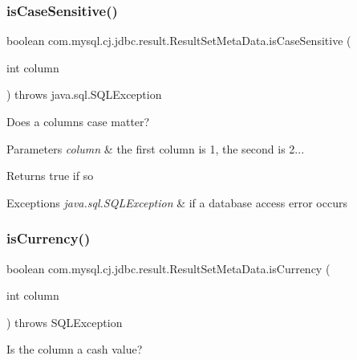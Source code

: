 \subsubsection{\texorpdfstring{is\+Case\+Sensitive()}{isCaseSensitive()}}
{\footnotesize\ttfamily boolean com.\+mysql.\+cj.\+jdbc.\+result.\+Result\+Set\+Meta\+Data.\+is\+Case\+Sensitive (\begin{DoxyParamCaption}\item[{int}]{column }\end{DoxyParamCaption}) throws java.\+sql.\+S\+Q\+L\+Exception}

Does a column\textquotesingle{}s case matter?


\begin{DoxyParams}{Parameters}
{\em column} & the first column is 1, the second is 2...\\
\hline
\end{DoxyParams}
\begin{DoxyReturn}{Returns}
true if so
\end{DoxyReturn}

\begin{DoxyExceptions}{Exceptions}
{\em java.\+sql.\+S\+Q\+L\+Exception} & if a database access error occurs \\
\hline
\end{DoxyExceptions}
\mbox{\label{classcom_1_1mysql_1_1cj_1_1jdbc_1_1result_1_1_result_set_meta_data_ac7a3732650739d19c5fa38abc5c3c174}} 
\subsubsection{\texorpdfstring{is\+Currency()}{isCurrency()}}
{\footnotesize\ttfamily boolean com.\+mysql.\+cj.\+jdbc.\+result.\+Result\+Set\+Meta\+Data.\+is\+Currency (\begin{DoxyParamCaption}\item[{int}]{column }\end{DoxyParamCaption}) throws S\+Q\+L\+Exception}

Is the column a cash value?


